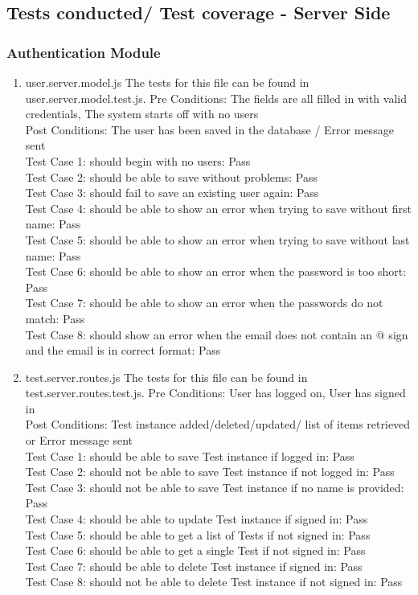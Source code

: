 \documentclass[a4paper,12pt]{report}
\begin{document}
\subsection{Tests conducted/ Test coverage - Server Side}

\subsubsection{Authentication Module }
\begin{enumerate}
\item user.server.model.js
The tests for this file can be found in user.server.model.test.js.
Pre Conditions: The fields are all filled in with valid credentials, The system starts off with no users \\
Post Conditions: The user has been saved in the database /  Error message sent\\ 
Test Case 1: should begin with no users: Pass\\
Test Case 2: should be able to save without problems: Pass\\
Test Case 3: should fail to save an existing user again: Pass\\
Test Case 4: should be able to show an error when trying to save without first name: Pass\\
Test Case 5: should be able to show an error when trying to save without last name: Pass\\
Test Case 6: should be able to show an error when the password is too short: Pass\\
Test Case 7: should be able to show an error when the passwords do not match: Pass\\
Test Case 8: should show an error when the email does not contain an @ sign and the email is in correct format: Pass\\

\item test.server.routes.js
The tests for this file can be found in test.server.routes.test.js.
Pre Conditions: User has logged on, User has signed in\\
Post Conditions: Test instance added/deleted/updated/ list of items retrieved or Error message sent \\
Test Case 1: should be able to save Test instance if logged in: Pass\\
Test Case 2: should not be able to save Test instance if not logged in: Pass\\
Test Case 3: should not be able to save Test instance if no name is provided: Pass\\
Test Case 4: should be able to update Test instance if signed in: Pass\\
Test Case 5: should be able to get a list of Tests if not signed in: Pass\\
Test Case 6: should be able to get a single Test if not signed in: Pass\\
Test Case 7: should be able to delete Test instance if signed in: Pass\\
Test Case 8: should not be able to delete Test instance if not signed in: Pass
\end{enumerate}
\end{document}
